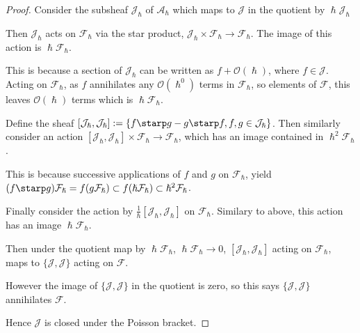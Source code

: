     \begin{proof}
    Consider the subsheaf \(\mathcal{J}_\hslash\)  of \(\mathcal{A}_{\hslash}\) which  maps to \( \mathcal{J}\) in the quotient by \(\hslash \mathcal{J}_{\hslash}\)
    
    Then \( \mathcal{J}_\hslash\) acts on \( \mathcal{F}_\hslash\) via the star product, 
    \( \mathcal{J}_\hslash \times \mathcal{F}_\hslash \rightarrow  \mathcal{F}_\hslash\).  The image of this action is \( \hslash \mathcal{F}_\hslash\).
    
    This is because a section of \( \mathcal{J}_{\hslash}\) can be written as \( f + \mathcal{O}(\hslash)\), where \(f \in \mathcal{J}\). Acting on \( \mathcal{F}_{\hslash}\), as \(f\) annihilates any \( \mathcal{O}(\hslash^0)\) terms in \( \mathcal{F}_{\hslash}\), so elements of \( \mathcal{F}\), this leaves \( \mathcal{O}(\hslash)\) terms which is \(\hslash \mathcal{F}_{\hslash}\).
    
    Define the sheaf \(  [\mathcal{J}_{\hslash},\mathcal{J}_{\hslash} ]:=  \{  f \starp g - g \starp f, f,g \in \mathcal{J}_{\hslash}\}\). Then similarly consider an action 
    \(  [\mathcal{J}_\hslash  ,   \mathcal{J}_\hslash  ]  \times \mathcal{F}_\hslash \rightarrow  \mathcal{F}_\hslash\), which has an image contained in \( \hslash^2 \mathcal{F}_{\hslash}\).
    
    This is because successive applications of \(f\) and \(g\) on \( \mathcal{F}_{\hslash}\), yield \( (f \starp g) \mathcal{F}_{\hslash} = f ( g \mathcal{F}_{\hslash}) \subset f ( \hslash \mathcal{F}_{\hslash} ) \subset \hslash^2 \mathcal{F}_{\hslash}\).
    
    
    Finally consider the action by
    \( \frac{1}{\hslash} [ \mathcal{J}_\hslash, \mathcal{J}_\hslash ] \) on \( \mathcal{F}_{\hslash}\). Similary to above, this action has an image \( \hslash \mathcal{F}_{\hslash}\).
    
    Then under the quotient map by \( \hslash \mathcal{F}_{\hslash}\),  \(\hslash \mathcal{F}_\hslash \rightarrow 0\), \( [\mathcal{J}_{\hslash} ,\mathcal{J}_{\hslash}]\) acting on \( \mathcal{F}_{\hslash}\), maps to \( \{\mathcal{J},\mathcal{J}\} \) acting on \( \mathcal{F}\). 
    
    However the image of \(\{\mathcal{J},\mathcal{J}\}\) in the quotient is zero, so this says  \(\{\mathcal{J},\mathcal{J}\}\) annihilates \( \mathcal{F}\).

    Hence \( \mathcal{J} \) is closed under the Poisson bracket.
    \end{proof}
    
